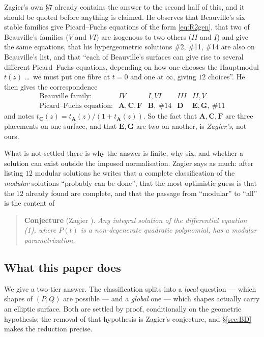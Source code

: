 \documentclass[11pt,reqno]{amsart}
\theoremstyle{plain}
\theoremstyle{definition}
\theoremstyle{remark}
\theoremstyle{plain}
\begin{document}
Zagier's own \S7 already contains the answer to the second half of this, and it
should be quoted before anything is claimed. He observes that Beauville's six
stable families give Picard--Fuchs equations of the form \eqref{eq:R2gen}, that
two of Beauville's families ($V$ and $VI$) are isogenous to two others ($II$ and
$I$) and give the same equations, that his hypergeometric solutions \#2, \#11,
\#14 are also on Beauville's list, and that ``each of Beauville's surfaces can
give rise to several different Picard--Fuchs equations, depending on how one
chooses the Hauptmodul $t(z)$ \dots\ we must put one fibre at $t=0$ and one at
$\infty$, giving $12$ choices''. He then gives the correspondence
\[
\begin{array}{lcccc}
\text{Beauville family:} & IV & I,VI & III & II,V\\
\text{Picard--Fuchs equation:} & \mathbf A,\mathbf C,\mathbf F
 & \mathbf B,\ \#14 & \mathbf D & \mathbf E,\mathbf G,\ \#11
\end{array}
\]
and notes $t_{\mathbf C}(z)=t_{\mathbf A}(z)/(1+t_{\mathbf A}(z))$. So the fact
that $\mathbf A,\mathbf C,\mathbf F$ are three placements on one surface, and
that $\mathbf E,\mathbf G$ are two on another, is \emph{Zagier's}, not ours.

What is not settled there is why the answer is finite, why six, and whether a
solution can exist outside the imposed normalisation. Zagier says as much: after
listing $12$ modular solutions he writes that a complete classification of the
\emph{modular} solutions ``probably can be done'', that the most optimistic guess
is that the $12$ already found are complete, and that the passage from ``modular''
to ``all'' is the content of

\begin{quote}
\textbf{Conjecture} (Zagier \cite[p.~6]{Zagier2009}). \emph{Any integral solution
of the differential equation \textup{(1)}, where $P(t)$ is a non-degenerate
quadratic polynomial, has a modular parametrization.}
\end{quote}

\subsection*{What this paper does}
We give a two-tier answer. The classification splits into a \emph{local}
question --- which shapes of $(P,Q)$ are possible --- and a \emph{global} one ---
which shapes actually carry an elliptic surface. Both are settled by proof,
conditionally on the geometric hypothesis; the removal of that hypothesis is
Zagier's conjecture, and \S\ref{sec:BD} makes the reduction precise.
\end{document}
